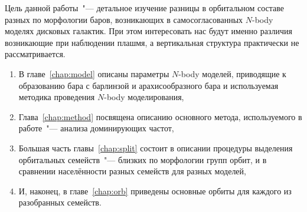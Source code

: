 \documentclass{trlnotes}
\begin{document}
Цель данной работы~"--- детальное изучение разницы в орбитальном составе разных по морфологии баров, возникающих
в самосогласованных $N$-body моделях дисковых галактик. При этом интересовать нас будут именно различия
возникающие при наблюдении плашмя, а вертикальная структура практически не рассматривается. 
\begin{enumerate}
  \item В главе~\ref{chap:model} описаны параметры $N$-body моделей, приводящие к образованию бара с барлинзой и
    арахисообразного бара и используемая методика проведения $N$-body моделирования,
  \item Глава~\ref{chap:method} посвящена описанию основного метода, используемого в работе~"--- анализа
    доминирующих частот,
  \item Большая часть главы~\ref{chap:split} состоит в описании процедуры выделения орбитальных семейств~"---
    близких по морфологии групп орбит, и в сравнении населённости разных семейств для разных моделей, 
  \item И, наконец, в главе~\ref{chap:orb} приведены основные орбиты для каждого из разобранных семейств.
\end{enumerate}
\end{document}
